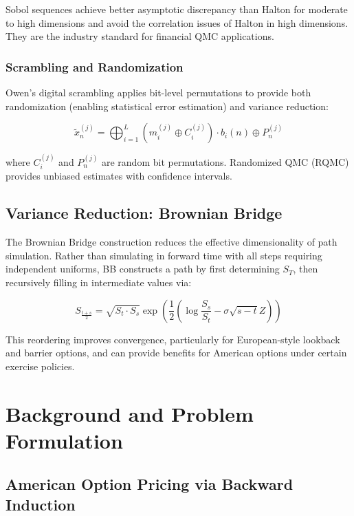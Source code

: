 \documentclass[11pt,a4paper]{article}
\begin{document}
Sobol sequences achieve better asymptotic discrepancy than Halton for moderate to high dimensions and avoid the correlation issues of Halton in high dimensions. They are the industry standard for financial QMC applications.

\subsubsection{Scrambling and Randomization}

Owen's digital scrambling \cite{owen1995randomly} applies bit-level permutations to provide both randomization (enabling statistical error estimation) and variance reduction:

\begin{equation}
\tilde{x}_n^{(j)} = \bigoplus_{i=1}^{L} \left( m_{i}^{(j)} \oplus C_{i}^{(j)} \right) \cdot b_i(n) \oplus P_n^{(j)}
\end{equation}

where $C_i^{(j)}$ and $P_n^{(j)}$ are random bit permutations. Randomized QMC (RQMC) provides unbiased estimates with confidence intervals.

\subsection{Variance Reduction: Brownian Bridge}

The Brownian Bridge construction \cite{moskowitzdynamic} reduces the effective dimensionality of path simulation. Rather than simulating in forward time with all steps requiring independent uniforms, BB constructs a path by first determining $S_T$, then recursively filling in intermediate values via:

\begin{equation}
S_{\frac{t+s}{2}} = \sqrt{S_t \cdot S_s} \exp\left(\frac{1}{2}\left(\log \frac{S_s}{S_t} - \sigma \sqrt{s-t} Z\right)\right)
\end{equation}

This reordering improves convergence, particularly for European-style lookback and barrier options, and can provide benefits for American options under certain exercise policies.

\section{Background and Problem Formulation}\label{sec:background}

\subsection{American Option Pricing via Backward Induction}
\end{document}
